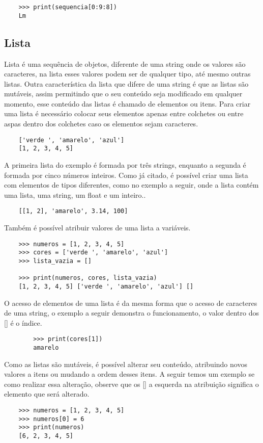 \begin{itemize}
\begin{lstlisting}
    >>> print(sequencia[0:9:8])
    Lm
        \end{lstlisting}

    \end{itemize}

			\subsection{Lista}
			Lista é uma sequência de objetos, diferente de uma string onde os valores são caracteres, na lista esses valores podem ser de qualquer tipo, até mesmo outras listas. Outra característica da lista que difere de uma string é que as listas são mutáveis, assim permitindo que o seu conteúdo seja modificado em qualquer momento, esse conteúdo das listas é chamado de elementos ou itens. Para criar uma lista é necessário colocar seus elementos apenas entre colchetes ou entre aspas dentro dos colchetes caso os elementos sejam caracteres.
			
			\begin{lstlisting}
	['verde ', 'amarelo', 'azul']
	[1, 2, 3, 4, 5]
			\end{lstlisting}
		A primeira lista do exemplo é formada por três strings, enquanto a segunda é formada por cinco números inteiros. Como já citado, é possível criar uma lista com elementos de tipos diferentes, como no exemplo a seguir, onde a lista contém uma lista, uma string, um float e um inteiro..
			
			\begin{lstlisting}
	[[1, 2], 'amarelo', 3.14, 100]
			\end{lstlisting}
		
		Também é possível atribuir valores de uma lista a variáveis.
		\begin{lstlisting}
	>>> numeros = [1, 2, 3, 4, 5]
	>>> cores = ['verde ', 'amarelo', 'azul']
	>>> lista_vazia = []
	
	>>> print(numeros, cores, lista_vazia)
	[1, 2, 3, 4, 5] ['verde ', 'amarelo', 'azul'] []
		\end{lstlisting}
	
	O acesso de elementos de uma lista é da mesma forma que o acesso de caracteres de uma string, o exemplo a seguir demonstra o funcionamento, o valor dentro dos [] é o índice.
	\begin{lstlisting}
		>>> print(cores[1])
		amarelo
	\end{lstlisting}
	Como as listas são mutáveis, é possível alterar seu conteúdo, atribuindo novos valores a itens ou mudando a ordem desses itens. A seguir temos um exemplo se como realizar essa alteração, observe que os [] a esquerda na atribuição significa o elemento que será alterado.
	\begin{lstlisting}
	>>> numeros = [1, 2, 3, 4, 5] 
	>>> numeros[0] = 6
	>>> print(numeros)
	[6, 2, 3, 4, 5]
	\end{lstlisting}

